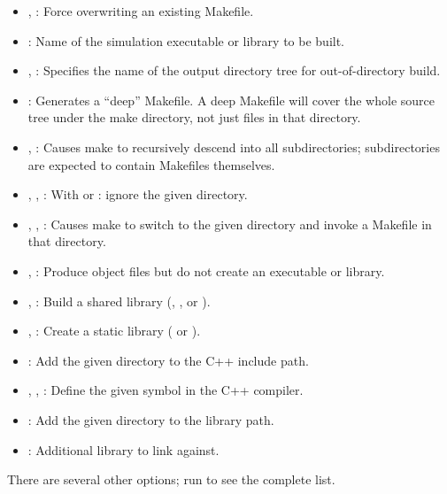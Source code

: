 \begin{itemize}
    \item {}, : Force overwriting an existing Makefile.
    \item {}: Name of the simulation executable or library to be built.
    \item {}, :
                          Specifies the name of the output directory tree for out-of-directory build.
    \item {}: Generates a ``deep'' Makefile. A deep Makefile will
                          cover the whole source tree under the make directory,
                          not just files in that directory.
    \item {}, : Causes make to recursively descend into all subdirectories;
                          subdirectories are expected to contain Makefiles themselves.
    \item {}, , :
                          With  or : ignore the given directory.
    \item {}, , :
                          Causes make to switch to the given directory and invoke
                          a Makefile in that directory.
    \item {}, : Produce object files but do not create an executable or library.
    \item {}, : Build a shared library (, , or ).
    \item {}, : Create a static library ( or ).
    \item {}: Add the given directory to the C++ include path.
    \item {}, , :
                          Define the given symbol in the C++ compiler.
    \item {}: Add the given directory to the library path.
    \item {}: Additional library to link against.
\end{itemize}

There are several other options; run  to see the complete
list.


